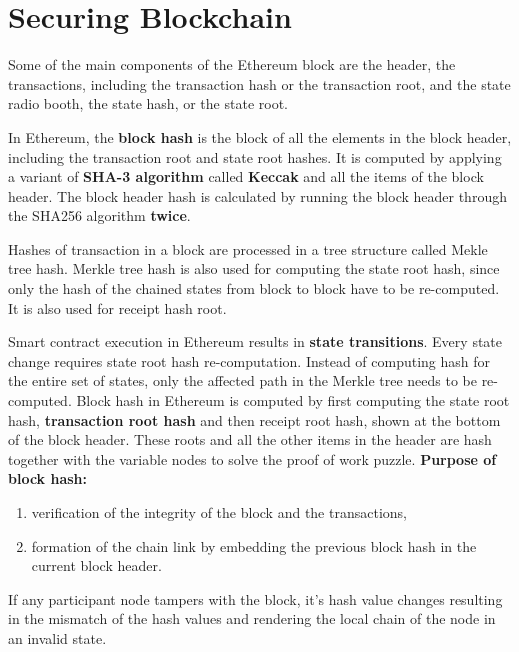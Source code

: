 \documentclass{article}
\begin{document}
\section{Securing Blockchain}
Some of the main components of the Ethereum block are the header, the transactions, including the transaction hash or the transaction root, and the state radio booth, the state hash, or the state root. \par
 In Ethereum, the \textbf{block hash} is the block of all the elements in the block header, including the transaction root and state root hashes. It is computed by applying a variant of \textbf{SHA-3 algorithm} called \textbf{Keccak} and all the items of the block header. The block header hash is calculated by running the block header through the SHA256 algorithm \textbf{twice}. \par
 Hashes of transaction in a block are processed in a tree structure called Mekle tree hash. Merkle tree hash is also used for computing the state root hash, since only the hash of the chained states from block to block have to be re-computed. It is also used for receipt hash root.\par
 Smart contract execution in Ethereum results in \textbf{state transitions}. Every state change requires state root hash re-computation. Instead of computing hash for the entire set of states, only the affected path in the Merkle tree needs to be re-computed. Block hash in Ethereum is computed by first computing the state root hash, \textbf{transaction root hash} and then receipt root hash, shown at the bottom of the block header. These roots and all the other items in the header are hash together with the variable nodes to solve the proof of work puzzle. \textbf{Purpose of block hash:}
 \begin{enumerate}
     \item verification of the integrity of the block and the transactions, 
     \item formation of the chain link by embedding the previous block hash in the current block header.
 \end{enumerate}
 If any participant node tampers with the block, it's hash value changes resulting in the mismatch of the hash values and rendering the local chain of the node in an invalid state.
 
\end{document}
